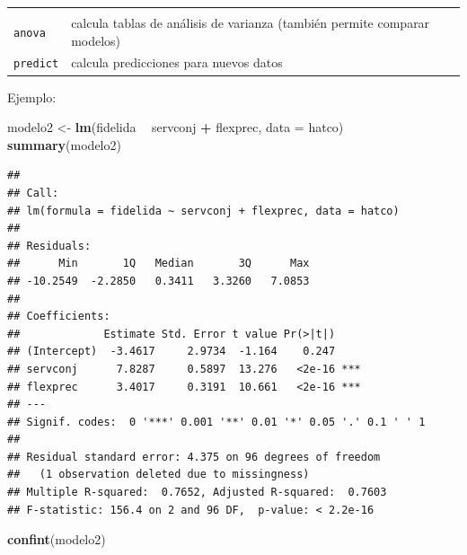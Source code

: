 \documentclass[]{book}
\newenvironment{Shaded}{\begin{snugshade}}{\end{snugshade}}
\newcommand{\KeywordTok}[1]{\textcolor[rgb]{0.13,0.29,0.53}{\textbf{#1}}}
\newcommand{\DataTypeTok}[1]{\textcolor[rgb]{0.13,0.29,0.53}{#1}}
\newcommand{\StringTok}[1]{\textcolor[rgb]{0.31,0.60,0.02}{#1}}
\newcommand{\OperatorTok}[1]{\textcolor[rgb]{0.81,0.36,0.00}{\textbf{#1}}}
\newcommand{\NormalTok}[1]{#1}
\begin{document}
\begin{longtable}[]{@{}ll@{}}
\begin{minipage}[t]{0.68\columnwidth}
\end{minipage}\tabularnewline
\begin{minipage}[t]{0.10\columnwidth}\raggedright\strut
\texttt{anova}\strut
\end{minipage} & \begin{minipage}[t]{0.68\columnwidth}\raggedright\strut
calcula tablas de análisis de varianza (también permite comparar
modelos)\strut
\end{minipage}\tabularnewline
\begin{minipage}[t]{0.10\columnwidth}\raggedright\strut
\texttt{predict}\strut
\end{minipage} & \begin{minipage}[t]{0.68\columnwidth}\raggedright\strut
calcula predicciones para nuevos datos\strut
\end{minipage}\tabularnewline
\bottomrule
\end{longtable}

Ejemplo:

\begin{Shaded}
\begin{Highlighting}[]
\NormalTok{modelo2 <-}\StringTok{ }\KeywordTok{lm}\NormalTok{(fidelida }\OperatorTok{~}\StringTok{ }\NormalTok{servconj }\OperatorTok{+}\StringTok{ }\NormalTok{flexprec, }\DataTypeTok{data =}\NormalTok{ hatco)}
\KeywordTok{summary}\NormalTok{(modelo2)}
\end{Highlighting}
\end{Shaded}

\begin{verbatim}
## 
## Call:
## lm(formula = fidelida ~ servconj + flexprec, data = hatco)
## 
## Residuals:
##      Min       1Q   Median       3Q      Max 
## -10.2549  -2.2850   0.3411   3.3260   7.0853 
## 
## Coefficients:
##             Estimate Std. Error t value Pr(>|t|)    
## (Intercept)  -3.4617     2.9734  -1.164    0.247    
## servconj      7.8287     0.5897  13.276   <2e-16 ***
## flexprec      3.4017     0.3191  10.661   <2e-16 ***
## ---
## Signif. codes:  0 '***' 0.001 '**' 0.01 '*' 0.05 '.' 0.1 ' ' 1
## 
## Residual standard error: 4.375 on 96 degrees of freedom
##   (1 observation deleted due to missingness)
## Multiple R-squared:  0.7652, Adjusted R-squared:  0.7603 
## F-statistic: 156.4 on 2 and 96 DF,  p-value: < 2.2e-16
\end{verbatim}

\begin{Shaded}
\begin{Highlighting}[]
\KeywordTok{confint}\NormalTok{(modelo2)}
\end{Highlighting}
\end{Shaded}
\end{document}

